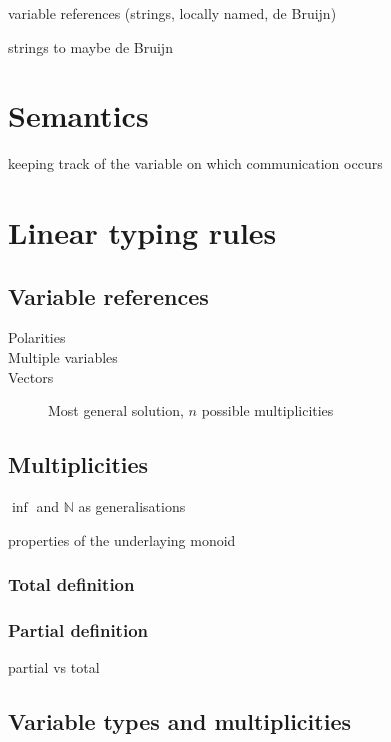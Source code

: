 \documentclass{scrartcl}
\begin{document}
variable references (strings, locally named, de Bruijn)

strings to maybe de Bruijn

\section{Semantics}

keeping track of the variable on which communication occurs

\section{Linear typing rules}

\subsection{Variable references}

\begin{description}
  \item[Polarities]
  \item[Multiple variables]
  \item[Vectors]
    Most general solution, $n$ possible multiplicities
\end{description}

\subsection{Multiplicities}

$\inf$ and $\mathbb{N}$ as generalisations

properties of the underlaying monoid

\subsubsection{Total definition}

\subsubsection{Partial definition}

partial vs total

\subsection{Variable types and multiplicities}
\end{document}
